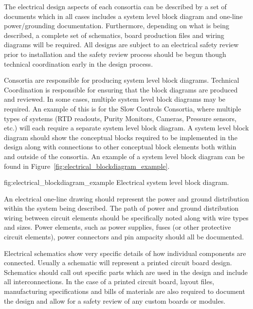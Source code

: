 The electrical design aspects of each consortia can be described by a
set of documents which in all cases includes a system level block
diagram and one-line power/grounding documentation.  Furthermore,
depending on what is being described, a complete set of schematics,
board production files and wiring diagrams will be required.  All
designs are subject to an electrical safety review prior to
installation and the safety review process should be begun though
technical coordination early in the design process.

Consortia are responsible for producing system level block
diagrams. Technical Coordination is responsible for ensuring that the
block diagrams are produced and reviewed.  In some cases, multiple
system level block diagrams may be required.  An example of this is
for the Slow Controls Consortia, where multiple types of systems (RTD
readouts, Purity Monitors, Cameras, Pressure sensors, etc.) will each
require a separate system level block diagram. A system level block
diagram should show the conceptual blocks required to be implemented
in the design along with connections to other conceptual block
elements both within and outside of the consortia.  An example of a
system level block diagram can be found in
Figure~\ref{fig:electrical_blockdiagram_example}.
\begin{dunefigure}{fig:electrical_blockdiagram_example}
  {Electrical system level block diagram.}
\end{dunefigure}

An electrical one-line drawing should represent the power and ground
distribution within the system being described.  The path of power and
ground distribution wiring between circuit elements should be
specifically noted along with wire types and sizes.  Power elements,
such as power supplies, fuses (or other protective circuit elements),
power connectors and pin ampacity should all be documented.

Electrical schematics show very specific details of how individual
components are connected.  Usually a schematic will represent a
printed circuit board design.  Schematics should call out specific
parts which are used in the design and include all interconnections.
In the case of a printed circuit board, layout files, manufacturing
specifications and bills of materials are also required to document
the design and allow for a safety review of any custom boards or
modules.


